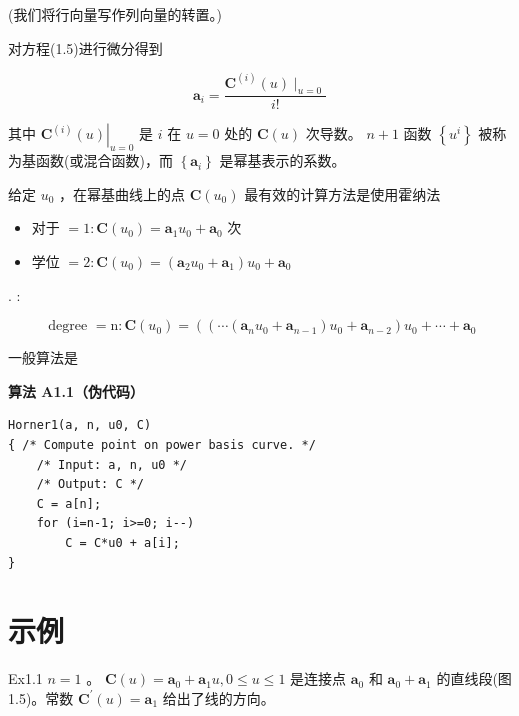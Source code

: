 \documentclass[../main.tex]{subfiles}
\begin{document}
(我们将行向量写作列向量的转置。)

对方程(1.5)进行微分得到

\[
{\mathbf{a}}_{i} = \frac{{\mathbf{C}}^{\left( i\right) }\left( u\right) { \mid  }_{u = 0}}{i!}
\]

其中 \({\left. {\mathbf{C}}^{\left( i\right) }\left( u\right) \right| }_{u = 0}\) 是 \(i\) 在 \(u = 0\) 处的 \(\mathbf{C}\left( u\right)\) 次导数。 \(n + 1\) 函数 \(\left\{  {u}^{i}\right\}\) 被称为基函数(或混合函数)，而 \(\left\{  {\mathbf{a}}_{i}\right\}\) 是幂基表示的系数。

给定 \({u}_{0}\) ，在幂基曲线上的点 \(\mathbf{C}\left( {u}_{0}\right)\) 最有效的计算方法是使用霍纳法

\begin{itemize}
\item 对于 \(= 1 : \mathbf{C}\left( {u}_{0}\right)  = {\mathbf{a}}_{1}{u}_{0} + {\mathbf{a}}_{0}\) 次
\end{itemize}

\begin{itemize}
\item 学位 \(= 2 : \mathbf{C}\left( {u}_{0}\right)  = \left( {{\mathbf{a}}_{2}{u}_{0} + {\mathbf{a}}_{1}}\right) {u}_{0} + {\mathbf{a}}_{0}\)
\end{itemize}

. :

\[
\text{ degree } = \mathrm{n} : \mathbf{C}\left( {u}_{0}\right)  = \left( {\left( {\cdots \left( {{\mathbf{a}}_{n}{u}_{0} + {\mathbf{a}}_{n - 1}}\right) {u}_{0} + {\mathbf{a}}_{n - 2}}\right) {u}_{0} + \cdots  + {\mathbf{a}}_{0}}\right.
\]

一般算法是

\par\medskip\noindent\textbf{算法 A1.1（伪代码）}\par
\begin{verbatim}
Horner1(a, n, u0, C)
{ /* Compute point on power basis curve. */
    /* Input: a, n, u0 */
    /* Output: C */
    C = a[n];
    for (i=n-1; i>=0; i--)
        C = C*u0 + a[i];
}
\end{verbatim}

\section*{示例}

Ex1.1 \(n = 1\) 。 \(\mathbf{C}\left( u\right)  = {\mathbf{a}}_{0} + {\mathbf{a}}_{1}u,0 \leq  u \leq  1\) 是连接点 \({\mathbf{a}}_{0}\) 和 \({\mathbf{a}}_{0} + {\mathbf{a}}_{1}\) 的直线段(图 1.5)。常数 \({\mathbf{C}}^{\prime }\left( u\right)  = {\mathbf{a}}_{1}\) 给出了线的方向。
\end{document}
